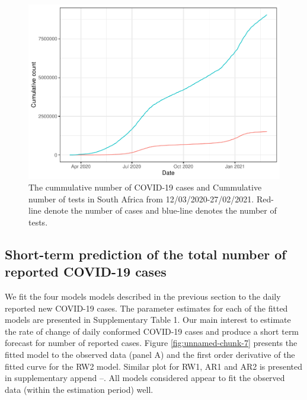 \documentclass[10pt,letterpaper]{article}
\begin{document}
\begin{figure}[H]
\includegraphics[width=0.99\linewidth]{COVIDincidenceSA_files/figure-latex/cummulative-1} \caption{The cummulative number of COVID-19 cases and Cummulative number of tests in South Africa from 12/03/2020-27/02/2021. Red-line denote the number of cases and blue-line denotes the number of tests.}\label{fig:cummulative}
\end{figure}

\hypertarget{short-term-prediction-of-the-total-number-of-reported-covid-19-cases}{%
\subsection{Short-term prediction of the total number of reported
COVID-19
cases}\label{short-term-prediction-of-the-total-number-of-reported-covid-19-cases}}

We fit the four models models described in the previous section to the daily
reported new COVID-19 cases. The parameter estimates for each of the fitted models
are presented in Supplementary Table 1. Our main interest to estimate the rate of change of daily conformed COVID-19 cases and produce a short term forecast for number of reported cases.  Figure \ref{fig:unnamed-chunk-7} presents the fitted model to the observed data (panel A) and the first order derivative of the fitted curve for the RW2 model. Similar plot for RW1, AR1 and AR2 is presented in supplementary append --. All models considered appear to fit the observed data (within the estimation period) well.
\end{document}
